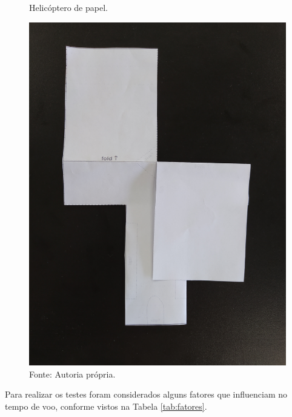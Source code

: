 \begin{figure}[H]
  \caption{Helicóptero de papel.}
  \centering
  \includegraphics[angle=0,width=1\textwidth]{images/IMG_20200918_162251.jpg}
  \caption*{Fonte: Autoria própria.}
  \label{fig:heli_papel}
\end{figure}

Para realizar os testes foram considerados alguns fatores que influenciam no tempo de voo, conforme vistos na Tabela \ref{tab:fatores}.

